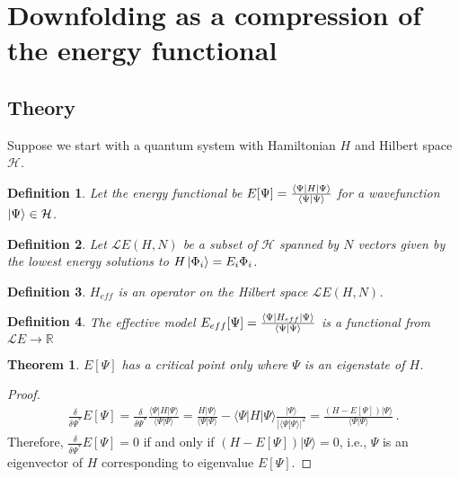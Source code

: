 \newtheorem{theorem}{Theorem}
\newtheorem{definition}{Definition}


\section{Downfolding as a compression of the energy functional}
\label{sec:theory}
\subsection{Theory} 

Suppose we start with a quantum system with Hamiltonian $H$ and Hilbert space ${\mathcal H}$.

\begin{definition}
Let the energy functional be $E[\Psi] = \frac{\bra{\Psi}H\ket{\Psi}}{\braket{\Psi|\Psi}}$ for a wavefunction $\ket{\Psi} \in {\mathcal H}$.
\end{definition}


\begin{definition}
Let ${\mathcal LE}(H,N)$ be a subset of ${\mathcal H}$ spanned by $N$ vectors given by the lowest energy solutions to $H\ket{\Phi_i}=E_i{\Phi_i}$. 
\end{definition}

\begin{definition}
$H_{eff}$ is an operator on the Hilbert space ${\mathcal LE(H,N)}$.	 
\end{definition}


\begin{definition}
The effective model $E_{eff}[\Psi]=\frac{\bra{\Psi}H_{eff}\ket{\Psi}}{\braket{\Psi|\Psi}}$ is a functional from ${\mathcal LE} \rightarrow \mathbb{R}$
\end{definition}



\begin{theorem}
\label{theorem:criticalpoint}
$E[\Psi]$ has a critical point only where $\Psi$ is an eigenstate of $H$.
\end{theorem}
\begin{proof}
\begin{eqnarray}
\frac{\delta }{\delta \Psi^*}  E[\Psi] = \frac{\delta}{\delta \Psi^*}\frac{\langle \Psi |H|\Psi\rangle}{\langle \Psi |\Psi\rangle} = \frac{H|\Psi\rangle}{\langle \Psi |\Psi\rangle} - \langle \Psi |H|\Psi\rangle \frac{|\Psi \rangle}{|\langle \Psi | \Psi\rangle|^2} =\frac{ (H-E[\Psi])|\Psi\rangle }{\langle\Psi|\Psi\rangle}\,.
\end{eqnarray}
Therefore, 
$\frac{\delta }{\delta \Psi^*}  E[\Psi] = 0$ if and only if $(H-E[\Psi])|\Psi\rangle =0$, i.e., $\Psi$ is an eigenvector of $H$ corresponding to eigenvalue $E[\Psi]$.  
\end{proof}


